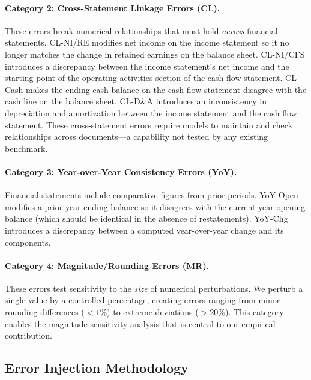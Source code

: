 \documentclass[11pt]{article}
\begin{document}
\paragraph{Category 2: Cross-Statement Linkage Errors (CL).}
These errors break numerical relationships that must hold \emph{across} financial statements.
CL-NI/RE modifies net income on the income statement so it no longer matches the change in retained earnings on the balance sheet.
CL-NI/CFS introduces a discrepancy between the income statement's net income and the starting point of the operating activities section of the cash flow statement.
CL-Cash makes the ending cash balance on the cash flow statement disagree with the cash line on the balance sheet.
CL-D\&A introduces an inconsistency in depreciation and amortization between the income statement and the cash flow statement.
These cross-statement errors require models to maintain and check relationships across documents---a capability not tested by any existing benchmark.

\paragraph{Category 3: Year-over-Year Consistency Errors (YoY).}
Financial statements include comparative figures from prior periods.
YoY-Open modifies a prior-year ending balance so it disagrees with the current-year opening balance (which should be identical in the absence of restatements).
YoY-Chg introduces a discrepancy between a computed year-over-year change and its components.

\paragraph{Category 4: Magnitude/Rounding Errors (MR).}
These errors test sensitivity to the \emph{size} of numerical perturbations.
We perturb a single value by a controlled percentage, creating errors ranging from minor rounding differences ($<1\%$) to extreme deviations ($>20\%$).
This category enables the magnitude sensitivity analysis that is central to our empirical contribution.

\subsection{Error Injection Methodology}
\label{sec:injection}
\end{document}
